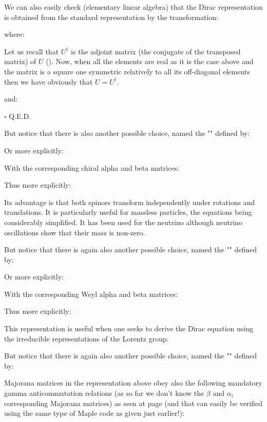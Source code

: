 	We can also easily check (elementary linear algebra) that the Dirac representation is obtained from the standard representation by the transformation:
	
	where:
	
	Let us recall that $U^\dagger$ is the adjoint matrix (the conjugate of the transposed matrix) of $U$ (). Now, when all the elements are real as it is the case above and the matrix is a square one symmetric relatively to all its off-diagonal elements then we have obviously that $U=U^\dagger$.
	\begin{dem}
	
	and:
	
	\begin{flushright}
		$\square$  Q.E.D.
	\end{flushright}
	\end{dem}
	But notice that there is also another possible choice, named the "" defined by:
	
	Or more explicitly:
	
	With the corresponding chiral alpha and beta matrices:
	
	Thus more explicitly:
	
	Its advantage is that both spinors transform independently under rotations and translations. It is particularly useful for massless particles, the equations being considerably simplified. It has been used for the neutrino although neutrino oscillations show that their mass is non-zero.
	
	But notice that there is again also another possible choice, named the "" defined by:
	
	Or more explicitly:
	
	With the corresponding Weyl alpha and beta matrices:
	
	Thus more explicitly:
	
	This representation is useful when one seeks to derive the Dirac equation using the irreducible representations of the Lorentz group.
	
	But notice that there is again also another possible choice, named the "" defined by:
	
	Majorana matrices in the representation above obey also the following mandatory gamma anticommutation relations (as so far we don't know the $\beta$ and $\alpha_i$ corresponding Majorana matrices) as seen at page \pageref{gamma anticommutation relations} (and that can easily be verified using the same type of Maple code as given just earlier!):
	
